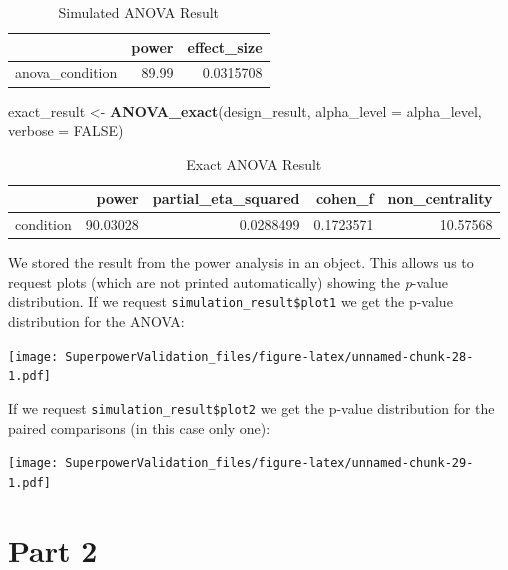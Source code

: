 \documentclass[]{book}
\newenvironment{Shaded}{\begin{snugshade}}{\end{snugshade}}
\newcommand{\DataTypeTok}[1]{\textcolor[rgb]{0.13,0.29,0.53}{#1}}
\newcommand{\KeywordTok}[1]{\textcolor[rgb]{0.13,0.29,0.53}{\textbf{#1}}}
\newcommand{\NormalTok}[1]{#1}
\newcommand{\OtherTok}[1]{\textcolor[rgb]{0.56,0.35,0.01}{#1}}
\newcommand{\StringTok}[1]{\textcolor[rgb]{0.31,0.60,0.02}{#1}}
\begin{document}
\begin{table}[!h]

\caption{\label{tab:unnamed-chunk-25}Simulated ANOVA Result}
\centering
\begin{tabular}{l|r|r}
\hline
  & power & effect\_size\\
\hline
anova\_condition & 89.99 & 0.0315708\\
\hline
\end{tabular}
\end{table}

\begin{Shaded}
\begin{Highlighting}[]
\NormalTok{exact_result <-}\StringTok{ }\KeywordTok{ANOVA_exact}\NormalTok{(design_result,}
                            \DataTypeTok{alpha_level =}\NormalTok{ alpha_level,}
                            \DataTypeTok{verbose =} \OtherTok{FALSE}\NormalTok{)}
\end{Highlighting}
\end{Shaded}

\begin{table}[!h]

\caption{\label{tab:unnamed-chunk-27}Exact ANOVA Result}
\centering
\begin{tabular}{l|r|r|r|r}
\hline
  & power & partial\_eta\_squared & cohen\_f & non\_centrality\\
\hline
condition & 90.03028 & 0.0288499 & 0.1723571 & 10.57568\\
\hline
\end{tabular}
\end{table}

We stored the result from the power analysis in an object. This allows us to request plots (which are not printed automatically) showing the \emph{p}-value distribution. If we request \texttt{simulation\_result\$plot1} we get the p-value distribution for the ANOVA:

\texttt{[image: SuperpowerValidation\_files/figure-latex/unnamed-chunk-28-1.pdf]}

If we request \texttt{simulation\_result\$plot2} we get the p-value distribution for the paired comparisons (in this case only one):

\texttt{[image: SuperpowerValidation\_files/figure-latex/unnamed-chunk-29-1.pdf]}
\newpage

\hypertarget{part-2}{%
\section{Part 2}\label{part-2}}
\end{document}

